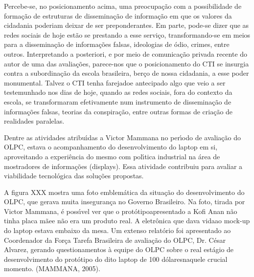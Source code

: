 \documentclass[
12pt,		%
openright,	%
twoside,  %
a4paper,			%
chapter=TITLE,		%
english,			%
french,				%
spanish,			%
brazil				%
]{USPSC-classe/USPSC}
\begin{document}
Percebe-se, no posicionamento acima, uma preocupa\c{c}\~ao com a possibilidade de forma\c{c}\~ao de estruturas de dissemina\c{c}\~ao de informa\c{c}\~ao em que os valores da cidadania poderiam deixar de ser preponderantes. Em parte, pode-se dizer que as redes sociais de hoje est\~ao se prestando a esse servi\c{c}o, transformando-se em meios para a dissemina\c{c}\~ao de informa\c{c}\~oes falsas, ideologias de \'odio, crimes, entre outros. Interpretando a posteriori, e por meio de comunica\c{c}\~ao privada recente do autor de uma das avalia\c{c}\~oes, parece-nos que o posicionamento do CTI se insurgia contra a subordina\c{c}\~ao da escola brasileira, ber\c{c}o de nossa cidadania, a esse poder monumental. Talvez o CTI tenha \textquotedbl farejado\textquotedbl  e antecipado algo que veio a ser testemunhado nos dias de hoje, quando as redes sociais, fora do contexto da escola, se transformaram efetivamente num instrumento de dissemina\c{c}\~ao de informa\c{c}\~oes falsas, teorias da conspira\c{c}\~ao, entre outras formas de cria\c{c}\~ao de realidades paralelas.










Dentre as atividades atribu\'{\i}das a Victor Mammana no per\'{\i}odo de avalia\c{c}\~ao do OLPC, estava o acompanhamento do desenvolvimento do laptop em si, aproveitando a experi\^encia do mesmo com pol\'{\i}tica industrial na \'area de mostradores de informa\c{c}\~oes (displays). Essa atividade contribuiu para avaliar a viabilidade tecnol\'ogica das solu\c{c}\~oes propostas.










A figura XXX mostra uma foto emblem\'atica da situa\c{c}\~ao do desenvolvimento do OLPC, que gerava muita inseguran\c{c}a no Governo Brasileiro. Na foto, tirada por Victor Mammana, \'e poss\'{\i}vel ver que o \textquotedbl prot\'otipo\textquotedbl  apresentado a Kofi Anan n\~ao tinha \textquotedbl placa m\~ae\textquotedbl  e n\~ao era um produto real. A eletr\^onica que \textquotedbl dava vida\textquotedbl  ao mock-up do laptop estava embaixo da mesa. Um extenso relat\'orio foi apresentado ao Coordenador da For\c{c}a Tarefa Brasileira de avalia\c{c}\~ao do OLPC, Dr. C\'esar Alvarez, gerando questionamentos \`a equipe do OLPC sobre o real est\'agio de desenvolvimento do prot\'otipo do dito \textquotedbl laptop de 100 d\'olares\textquotedbl  naquele crucial momento. (MAMMANA, 2005).
\end{document}
